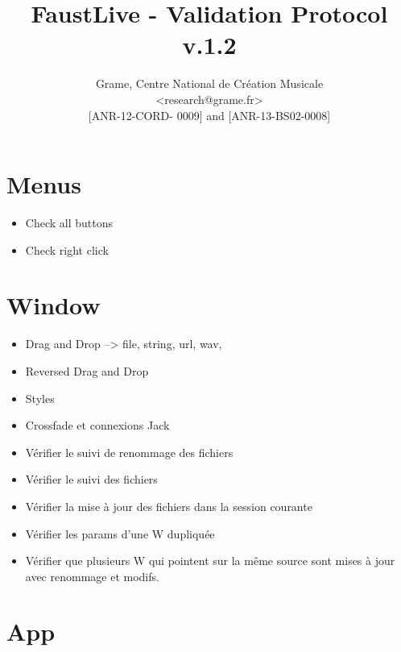 \documentclass[a4paper]{article}
\begin{document}
\title{FaustLive - Validation Protocol \\ v.1.2}

\author{Grame, Centre National de Création Musicale\\
{\small <research@grame.fr>} \\
\vspace{2mm}
[ANR-12-CORD- 0009] and [ANR-13-BS02-0008]
}

\maketitle


\newpage
\section{Menus}

\begin{itemize}
\item Check all buttons
\item Check right click
\end{itemize}

\section{Window}

\begin{itemize}
\item Drag and Drop --> file, string, url, wav, 
\item Reversed Drag and Drop
\item Styles
\item Crossfade et connexions Jack
\item Vérifier le suivi de renommage des fichiers
\item Vérifier le suivi des fichiers
\item Vérifier la mise à jour des fichiers dans la session courante
\item Vérifier les params d'une W dupliquée
\item Vérifier que plusieurs W qui pointent sur la même source sont mises à jour avec renommage et modifs.
\end{itemize}

\section{App}
\end{document}
